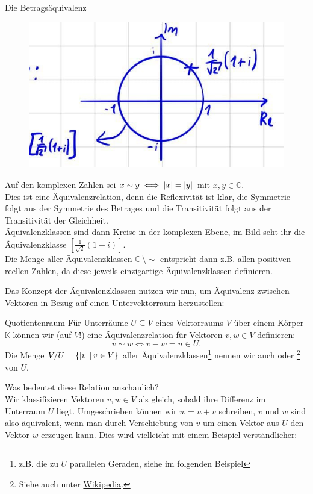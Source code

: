 \begin{Beispiel}
{Die Betragsäquivalenz}
\begin{figure}
 \vspace{-15pt}
\includegraphics[width=.25\textwidth]{Dateien/01/01Betragsklassen.jpg}
 \vspace{-15pt}
\end{figure}
Auf den komplexen Zahlen sei $x\sim y\iff \left|{x}\right|=\left|{y}\right|$ mit $x,y\in\mathbb{C}$.\\
Dies ist eine Äquivalenzrelation, denn die Reflexivität ist klar, die Symmetrie folgt aus der Symmetrie des Betrages und die Transitivität folgt aus der Transitivität der Gleichheit.\\
Äquivalenzklassen sind dann Kreise in der komplexen Ebene, im Bild seht ihr die Äquivalenzklasse $[\frac{1}{\sqrt{2}}(1+i)]$.\\
Die Menge aller Äquivalenzklassen $\mathbb{C}\,\setminus\sim$ entspricht dann z.B. allen positiven reellen Zahlen, da diese jeweils einzigartige Äquivalenzklassen definieren.
\end{Beispiel}
Das Konzept der Äquivalenzklassen nutzen wir nun, um Äquivalenz zwischen Vektoren in Bezug auf einen Untervektorraum herzustellen:
\begin{Def}
{Quotientenraum}
Für Unterräume $U\subseteq V$ eines Vektorraums $V$ über einem Körper $\mathbb{K}$ können wir (auf $V$!) eine Äquivalenzrelation für Vektoren $v,w\in V$ definieren:
\begin{equation}
    v\sim w\iff v-w=u\in U.
\end{equation}
Die Menge $V/U=\left\{[v]\,|\, v\in V\right\}$ aller Äquivalenzklassen\footnote{z.B. die zu $U$ parallelen Geraden, siehe im folgenden Beispiel} nennen wir auch  oder \footnote{Siehe auch unter \href{https://de.wikipedia.org/wiki/Faktorraum}{Wikipedia}.} von $U$.
\end{Def}
Was bedeutet diese Relation anschaulich?\\
Wir klassifizieren Vektoren $v,w\in V$ als gleich, sobald ihre Differenz im Unterraum $U$ liegt. Umgeschrieben können wir $w=u+v$ schreiben, $v$ und $w$ sind also äquivalent, wenn man durch Verschiebung von $v$ um einen Vektor aus $U$ den Vektor $w$ erzeugen kann. Dies wird vielleicht mit einem Beispiel verständlicher:
